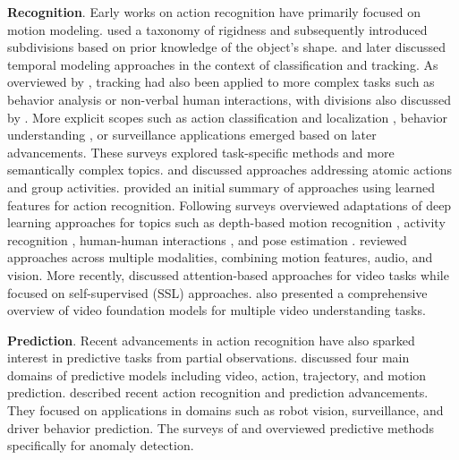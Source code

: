 \noindent
\textbf{Recognition}. Early works on action recognition have primarily focused on motion modeling. \citet{aggarwal1994articulated} used a taxonomy of rigidness and subsequently \citep{aggarwal1998nonrigid} introduced subdivisions based on prior knowledge of the object's shape. \citet{cedras1995motion} and later \citet{moeslund2001survey} discussed temporal modeling approaches in the context of classification and tracking. As overviewed by \citet{buxton2003learning}, tracking had also been applied to more complex tasks such as behavior analysis or non-verbal human interactions, with divisions also discussed by \citet{poppe2007vision}. 
More explicit scopes such as action classification and localization \citep{weinland2011survey}, behavior understanding \citep{chaaraoui2012review}, or surveillance applications \citep{vishwakarma2013survey} emerged based on later advancements. These surveys explored task-specific methods and more semantically complex topics. \citet{turaga2008machine} and \citet{poppe2010survey} discussed approaches addressing atomic actions and group activities. \citet{herath2017going} provided an initial summary of approaches using learned features for action recognition. Following surveys overviewed adaptations of deep learning approaches for topics such as depth-based motion recognition \citep{wang2018rgb}, activity recognition \citep{beddiar2020vision}, human-human interactions \citep{stergiou2019analyzing}, and pose estimation \citep{zheng2020deep}. \citet{sun2022human} reviewed approaches across multiple modalities, combining motion features, audio, and vision. More recently, \citet{selva2023video} discussed attention-based approaches for video tasks while \citet{schiappa2023self} focused on self-supervised (SSL) approaches. \citet{madan2024foundation} also presented a comprehensive overview of video foundation models for multiple video understanding tasks.

\noindent
\textbf{Prediction}. Recent advancements in action recognition have also sparked interest in predictive tasks from partial observations. \citet{rasouli2020deep} discussed four main domains of predictive models including video, action, trajectory, and motion prediction. \citet{kong2022human} described recent action recognition and prediction advancements. They focused on applications in domains such as robot vision, surveillance, and driver behavior prediction. The surveys of \citet{dhiman2019review} and \citet{ramachandra2020survey} overviewed predictive methods specifically for anomaly detection.

